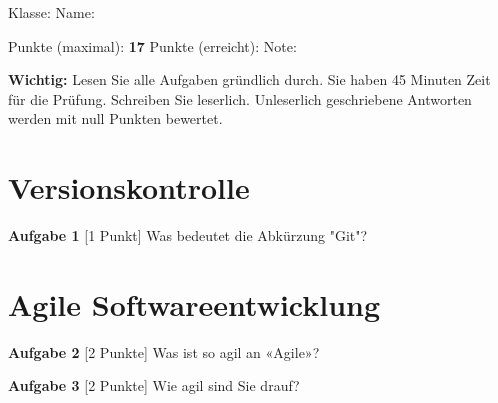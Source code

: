 \documentclass[a4paper,12pt]{scrartcl}
\begin{document}
\begin{large}
    Klasse: \underline{\hspace{6em}} \hspace{1em} Name: \underline{\hspace{17.5em}}

\vspace{14pt}

    Punkte (maximal): \textbf{17} \hspace{1em} Punkte (erreicht): \underline{\hspace{4em}} \hspace{1em} Note: \underline{\hspace{5em}}
\end{large}

\vspace{14pt}
\dotfill
\vspace{14pt}

\textbf{Wichtig:} Lesen Sie alle Aufgaben gründlich durch. Sie haben 45 Minuten Zeit für die Prüfung. Schreiben Sie leserlich. Unleserlich geschriebene Antworten werden mit null Punkten bewertet.

\section{Versionskontrolle}

\textbf{Aufgabe 1} [1 Punkt] Was bedeutet die Abkürzung "Git"?

\begin{LARGE}
    \hrulefill

    \hrulefill

    \hrulefill

\end{LARGE}

\section{Agile Softwareentwicklung}

\textbf{Aufgabe 2} [2 Punkte] Was ist so agil an «Agile»?

\begin{LARGE}
    \hrulefill

    \hrulefill

    \hrulefill

\end{LARGE}

\vspace{14pt}

\textbf{Aufgabe 3} [2 Punkte] Wie agil sind Sie drauf?

\begin{LARGE}
    \hrulefill

    \hrulefill

    \hrulefill

\end{LARGE}
\end{document}
